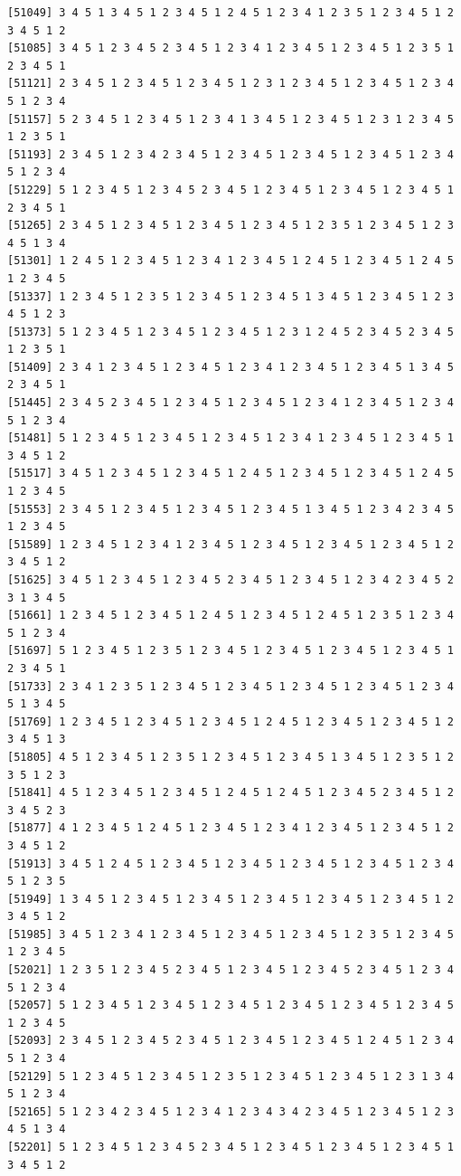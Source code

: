 \documentclass[
  english,
]{book}
\begin{document}
\begin{verbatim}
[51049] 3 4 5 1 3 4 5 1 2 3 4 5 1 2 4 5 1 2 3 4 1 2 3 5 1 2 3 4 5 1 2 3 4 5 1 2
[51085] 3 4 5 1 2 3 4 5 2 3 4 5 1 2 3 4 1 2 3 4 5 1 2 3 4 5 1 2 3 5 1 2 3 4 5 1
[51121] 2 3 4 5 1 2 3 4 5 1 2 3 4 5 1 2 3 1 2 3 4 5 1 2 3 4 5 1 2 3 4 5 1 2 3 4
[51157] 5 2 3 4 5 1 2 3 4 5 1 2 3 4 1 3 4 5 1 2 3 4 5 1 2 3 1 2 3 4 5 1 2 3 5 1
[51193] 2 3 4 5 1 2 3 4 2 3 4 5 1 2 3 4 5 1 2 3 4 5 1 2 3 4 5 1 2 3 4 5 1 2 3 4
[51229] 5 1 2 3 4 5 1 2 3 4 5 2 3 4 5 1 2 3 4 5 1 2 3 4 5 1 2 3 4 5 1 2 3 4 5 1
[51265] 2 3 4 5 1 2 3 4 5 1 2 3 4 5 1 2 3 4 5 1 2 3 5 1 2 3 4 5 1 2 3 4 5 1 3 4
[51301] 1 2 4 5 1 2 3 4 5 1 2 3 4 1 2 3 4 5 1 2 4 5 1 2 3 4 5 1 2 4 5 1 2 3 4 5
[51337] 1 2 3 4 5 1 2 3 5 1 2 3 4 5 1 2 3 4 5 1 3 4 5 1 2 3 4 5 1 2 3 4 5 1 2 3
[51373] 5 1 2 3 4 5 1 2 3 4 5 1 2 3 4 5 1 2 3 1 2 4 5 2 3 4 5 2 3 4 5 1 2 3 5 1
[51409] 2 3 4 1 2 3 4 5 1 2 3 4 5 1 2 3 4 1 2 3 4 5 1 2 3 4 5 1 3 4 5 2 3 4 5 1
[51445] 2 3 4 5 2 3 4 5 1 2 3 4 5 1 2 3 4 5 1 2 3 4 1 2 3 4 5 1 2 3 4 5 1 2 3 4
[51481] 5 1 2 3 4 5 1 2 3 4 5 1 2 3 4 5 1 2 3 4 1 2 3 4 5 1 2 3 4 5 1 3 4 5 1 2
[51517] 3 4 5 1 2 3 4 5 1 2 3 4 5 1 2 4 5 1 2 3 4 5 1 2 3 4 5 1 2 4 5 1 2 3 4 5
[51553] 2 3 4 5 1 2 3 4 5 1 2 3 4 5 1 2 3 4 5 1 3 4 5 1 2 3 4 2 3 4 5 1 2 3 4 5
[51589] 1 2 3 4 5 1 2 3 4 1 2 3 4 5 1 2 3 4 5 1 2 3 4 5 1 2 3 4 5 1 2 3 4 5 1 2
[51625] 3 4 5 1 2 3 4 5 1 2 3 4 5 2 3 4 5 1 2 3 4 5 1 2 3 4 2 3 4 5 2 3 1 3 4 5
[51661] 1 2 3 4 5 1 2 3 4 5 1 2 4 5 1 2 3 4 5 1 2 4 5 1 2 3 5 1 2 3 4 5 1 2 3 4
[51697] 5 1 2 3 4 5 1 2 3 5 1 2 3 4 5 1 2 3 4 5 1 2 3 4 5 1 2 3 4 5 1 2 3 4 5 1
[51733] 2 3 4 1 2 3 5 1 2 3 4 5 1 2 3 4 5 1 2 3 4 5 1 2 3 4 5 1 2 3 4 5 1 3 4 5
[51769] 1 2 3 4 5 1 2 3 4 5 1 2 3 4 5 1 2 4 5 1 2 3 4 5 1 2 3 4 5 1 2 3 4 5 1 3
[51805] 4 5 1 2 3 4 5 1 2 3 5 1 2 3 4 5 1 2 3 4 5 1 3 4 5 1 2 3 5 1 2 3 5 1 2 3
[51841] 4 5 1 2 3 4 5 1 2 3 4 5 1 2 4 5 1 2 4 5 1 2 3 4 5 2 3 4 5 1 2 3 4 5 2 3
[51877] 4 1 2 3 4 5 1 2 4 5 1 2 3 4 5 1 2 3 4 1 2 3 4 5 1 2 3 4 5 1 2 3 4 5 1 2
[51913] 3 4 5 1 2 4 5 1 2 3 4 5 1 2 3 4 5 1 2 3 4 5 1 2 3 4 5 1 2 3 4 5 1 2 3 5
[51949] 1 3 4 5 1 2 3 4 5 1 2 3 4 5 1 2 3 4 5 1 2 3 4 5 1 2 3 4 5 1 2 3 4 5 1 2
[51985] 3 4 5 1 2 3 4 1 2 3 4 5 1 2 3 4 5 1 2 3 4 5 1 2 3 5 1 2 3 4 5 1 2 3 4 5
[52021] 1 2 3 5 1 2 3 4 5 2 3 4 5 1 2 3 4 5 1 2 3 4 5 2 3 4 5 1 2 3 4 5 1 2 3 4
[52057] 5 1 2 3 4 5 1 2 3 4 5 1 2 3 4 5 1 2 3 4 5 1 2 3 4 5 1 2 3 4 5 1 2 3 4 5
[52093] 2 3 4 5 1 2 3 4 5 2 3 4 5 1 2 3 4 5 1 2 3 4 5 1 2 4 5 1 2 3 4 5 1 2 3 4
[52129] 5 1 2 3 4 5 1 2 3 4 5 1 2 3 5 1 2 3 4 5 1 2 3 4 5 1 2 3 1 3 4 5 1 2 3 4
[52165] 5 1 2 3 4 2 3 4 5 1 2 3 4 1 2 3 4 3 4 2 3 4 5 1 2 3 4 5 1 2 3 4 5 1 3 4
[52201] 5 1 2 3 4 5 1 2 3 4 5 2 3 4 5 1 2 3 4 5 1 2 3 4 5 1 2 3 4 5 1 3 4 5 1 2

\end{verbatim}
\end{document}
